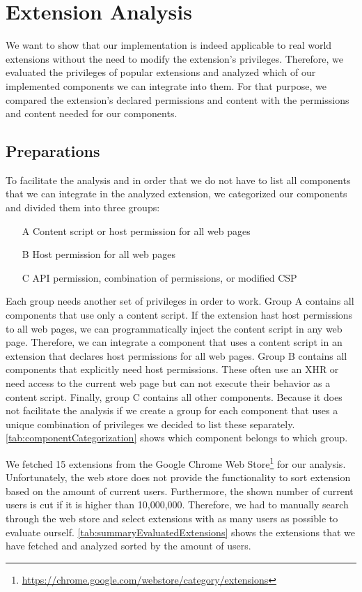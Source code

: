 
\chapter{Extension Analysis}
	
	We want to show that our implementation is indeed applicable to real world extensions without the need to modify the extension's privileges. Therefore, we evaluated the privileges of popular extensions and analyzed which of our implemented components we can integrate into them. For that purpose, we compared the extension's declared permissions and content with the permissions and content needed for our components. 
	
\section{Preparations}

	To facilitate the analysis and in order that we do not have to list all components that we can integrate in the analyzed extension, we categorized our components and divided them into three groups:

	\begin{itemize}[nosep]
		\item[A] Content script or host permission for all web pages
		\item[B] Host permission for all web pages
		\item[C] API permission, combination of permissions, or modified CSP
	\end{itemize}
	
	Each group needs another set of privileges in order to work. Group A contains all components that use only a content script. If the extension hast host permissions to all web pages, we can programmatically inject the content script in any web page. Therefore, we can integrate a component that uses a content script in an extension that declares host permissions for all web pages. Group B contains all components that explicitly need host permissions. These often use an XHR or need access to the current web page but can not execute their behavior as a content script. Finally, group C contains all other components. Because it does not facilitate the analysis if we create a group for each component that uses a unique combination of privileges we decided to list these separately. \autoref{tab:componentCategorization} shows which component belongs to which group. 
	
	We fetched 15 extensions from the Google Chrome Web Store\footnote{\url{https://chrome.google.com/webstore/category/extensions}} for our analysis. Unfortunately, the web store does not provide the functionality to sort extension based on the amount of current users. Furthermore, the shown number of current users is cut if it is higher than 10,000,000. Therefore, we had to manually search through the web store and select extensions with as many users as possible to evaluate ourself. \autoref{tab:summaryEvaluatedExtensions} shows the extensions that we have fetched and analyzed sorted by the amount of users. %
	
